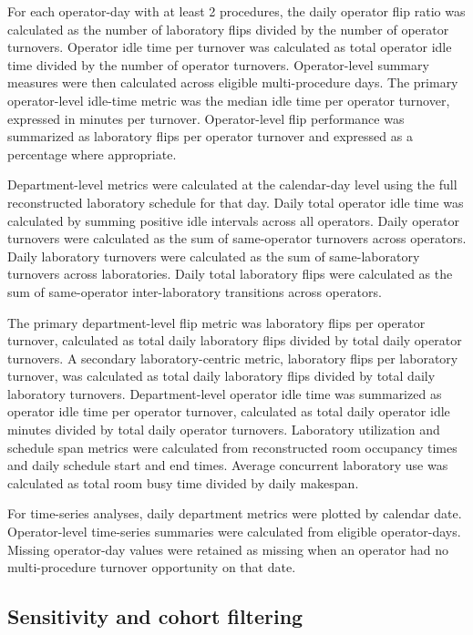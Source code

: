 \documentclass[12pt]{article}
\begin{document}
For each operator-day with at least 2 procedures, the daily operator flip ratio was calculated as the number of laboratory flips divided by the number of operator turnovers. Operator idle time per turnover was calculated as total operator idle time divided by the number of operator turnovers. Operator-level summary measures were then calculated across eligible multi-procedure days. The primary operator-level idle-time metric was the median idle time per operator turnover, expressed in minutes per turnover. Operator-level flip performance was summarized as laboratory flips per operator turnover and expressed as a percentage where appropriate.

Department-level metrics were calculated at the calendar-day level using the full reconstructed laboratory schedule for that day. Daily total operator idle time was calculated by summing positive idle intervals across all operators. Daily operator turnovers were calculated as the sum of same-operator turnovers across operators. Daily laboratory turnovers were calculated as the sum of same-laboratory turnovers across laboratories. Daily total laboratory flips were calculated as the sum of same-operator inter-laboratory transitions across operators.

The primary department-level flip metric was laboratory flips per operator turnover, calculated as total daily laboratory flips divided by total daily operator turnovers. A secondary laboratory-centric metric, laboratory flips per laboratory turnover, was calculated as total daily laboratory flips divided by total daily laboratory turnovers. Department-level operator idle time was summarized as operator idle time per operator turnover, calculated as total daily operator idle minutes divided by total daily operator turnovers. Laboratory utilization and schedule span metrics were calculated from reconstructed room occupancy times and daily schedule start and end times. Average concurrent laboratory use was calculated as total room busy time divided by daily makespan.

For time-series analyses, daily department metrics were plotted by calendar date. Operator-level time-series summaries were calculated from eligible operator-days. Missing operator-day values were retained as missing when an operator had no multi-procedure turnover opportunity on that date.

\subsection{Sensitivity and cohort filtering}
\end{document}
